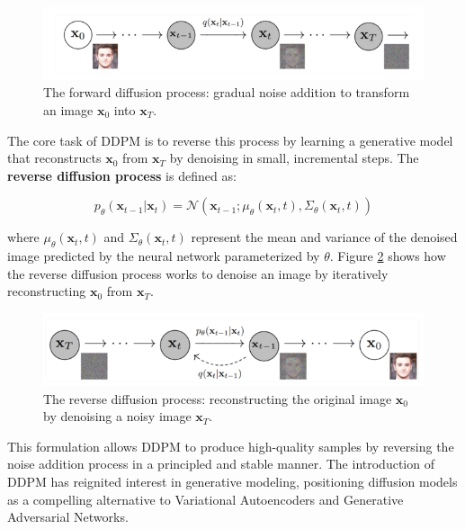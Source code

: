 \documentclass[12pt,DIV14,BCOR12mm,a4paper,footinclude=false,headinclude,parskip=half-,twoside,openright,cleardoublepage=empty,toc=index,bibliography=totoc,listof=totoc]{scrreprt}
\numberwithin{equation}{chapter}
\begin{document}
\begin{figure}
	\centering
	\includegraphics[scale=.9]{../media/diffusion_forward_process.png}
	\caption{The forward diffusion process: gradual noise addition to transform an image \(\mathbf{x}_0\) into \(\mathbf{x}_T\).}
	\label{forward}
\end{figure}

The core task of DDPM is to reverse this process by learning a generative model that reconstructs \(\mathbf{x}_0\) from \(\mathbf{x}_T\) by denoising in small, incremental steps. The \textbf{reverse diffusion process} is defined as:

\begin{equation}
p_\theta(\mathbf{x}_{t-1} | \mathbf{x}_t) = \mathcal{N}(\mathbf{x}_{t-1}; \mu_\theta(\mathbf{x}_t, t), \Sigma_\theta(\mathbf{x}_t, t))
\end{equation}

where \(\mu_\theta(\mathbf{x}_t, t)\) and \(\Sigma_\theta(\mathbf{x}_t, t)\) represent the mean and variance of the denoised image predicted by the neural network parameterized by \(\theta\). Figure \ref{reverse} shows how the reverse diffusion process works to denoise an image by iteratively reconstructing \(\mathbf{x}_0\) from \(\mathbf{x}_T\).

\begin{figure}
	\centering
	\includegraphics[scale=.9]{../media/diffusion_reverse_process.png}
	\caption{The reverse diffusion process: reconstructing the original image \(\mathbf{x}_0\) by denoising a noisy image \(\mathbf{x}_T\).}
	\label{reverse}
\end{figure}

This formulation allows DDPM to produce high-quality samples by reversing the noise addition process in a principled and stable manner. The introduction of DDPM has reignited interest in generative modeling, positioning diffusion models as a compelling alternative to Variational Autoencoders and Generative Adversarial Networks.
\end{document}
